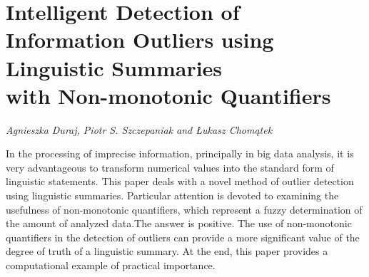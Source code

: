 \documentclass[../booklet.tex]{subfiles}
\begin{document}
\section[Intelligent Detection of Information Outliers using Linguistic Summaries \\with Non-monotonic Quantifiers. {\it Agnieszka Duraj, Piotr S. Szczepaniak and Łukasz Chomątek}]{Intelligent Detection of Information Outliers using Linguistic Summaries \\with Non-monotonic Quantifiers}
  

\begin{center}
  {\it Agnieszka Duraj, Piotr S. Szczepaniak and Łukasz Chomątek}
\end{center}

\vskip 0.8cm


In the processing of imprecise information, principally in big data analysis, it is very advantageous to transform numerical values into the standard form of linguistic statements. 
This paper deals with a novel method of outlier detection using linguistic summaries. Particular attention is devoted to examining the usefulness of non-monotonic quantifiers, which represent a fuzzy determination of the amount of analyzed data.The answer is positive. The use of non-monotonic quantifiers in the detection of outliers can provide a more significant value of the degree of truth of a linguistic summary. At the end, this paper provides a computational example of practical importance.

\end{document}
